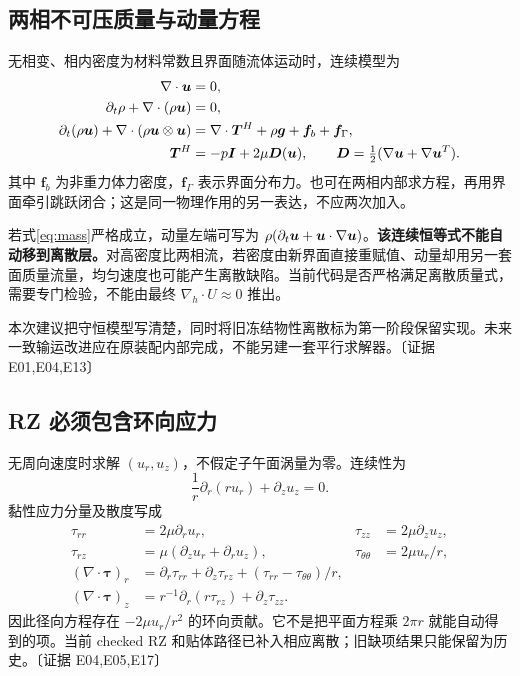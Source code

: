 \documentclass[UTF8,a4paper,11pt,fontset=fandol]{ctexart}
\newcommand{\ev}[1]{{\small\color{muted}〔证据 #1〕}}
\begin{document}
\subsection{两相不可压质量与动量方程}
无相变、相内密度为材料常数且界面随流体运动时，连续模型为
\begin{align}
 \nabla\cdot\bm u&=0,\label{eq:incompressible}\\
 \partial_t\rho+\nabla\cdot(\rho\bm u)&=0,\label{eq:mass}\\
 \partial_t(\rho\bm u)+\nabla\cdot(\rho\bm u\otimes\bm u)
 &=\nabla\cdot\bm T^H+\rho\bm g+\bm f_b+\bm f_\Gamma,\label{eq:momentum}\\
 \bm T^H&=-p\bm I+2\mu\bm D(\bm u),\qquad
 \bm D=\tfrac12(\nabla\bm u+\nabla\bm u^T).
\end{align}
其中 $\bm f_b$ 为非重力体力密度，$\bm f_\Gamma$ 表示界面分布力。也可在两相内部求方程，再用界面牵引跳跃闭合；这是同一物理作用的另一表达，不应两次加入。

若式\eqref{eq:mass}严格成立，动量左端可写为 $\rho(\partial_t\bm u+\bm u\cdot\nabla\bm u)$。\textbf{该连续恒等式不能自动移到离散层。}对高密度比两相流，若密度由新界面直接重赋值、动量却用另一套面质量流量，均匀速度也可能产生离散缺陷。当前代码是否严格满足离散质量式，需要专门检验，不能由最终 $\nabla_h\cdot U\approx0$ 推出。

本次建议把守恒模型写清楚，同时将旧冻结物性离散标为第一阶段保留实现。未来一致输运改进应在原装配内部完成，不能另建一套平行求解器。\ev{E01,E04,E13}

\subsection{RZ 必须包含环向应力}
无周向速度时求解 $(u_r,u_z)$，不假定子午面涡量为零。连续性为
\[
 \frac1r\partial_r(ru_r)+\partial_z u_z=0.
\]
黏性应力分量及散度写成
\begin{align}
 \tau_{rr}&=2\mu\partial_ru_r,&\tau_{zz}&=2\mu\partial_zu_z,\\
 \tau_{rz}&=\mu(\partial_zu_r+\partial_ru_z),&
 \tau_{\theta\theta}&=2\mu u_r/r,\\
 (\nabla\cdot\bm\tau)_r&=\partial_r\tau_{rr}
   +\partial_z\tau_{rz}+(\tau_{rr}-\tau_{\theta\theta})/r,\label{eq:rzstress}\\
 (\nabla\cdot\bm\tau)_z&=r^{-1}\partial_r(r\tau_{rz})+\partial_z\tau_{zz}.
\end{align}
因此径向方程存在 $-2\mu u_r/r^2$ 的环向贡献。它不是把平面方程乘 $2\pi r$ 就能自动得到的项。当前 checked RZ 和贴体路径已补入相应离散；旧缺项结果只能保留为历史。\ev{E04,E05,E17}
\end{document}
